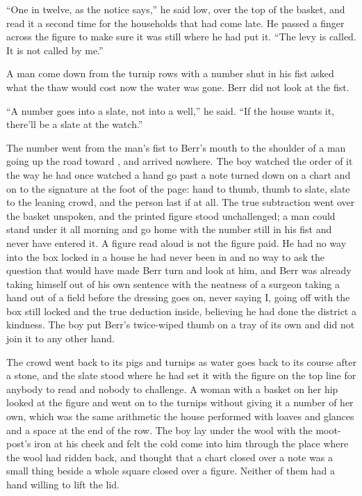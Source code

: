 “One in twelve, as the notice says,” he said low, over the top of the basket, and read it a second time for the households that had come late. He passed a finger across the figure to make sure it was still where he had put it. “The levy is called. It is not called by me.”

A man come down from the turnip rows with a number shut in his fist asked what the thaw would cost now the water was gone. Berr did not look at the fist.

“A number goes into a slate, not into a well,” he said. “If the house wants it, there'll be a slate at the watch.”

The number went from the man's fist to Berr's mouth to the shoulder of a man going up the road toward , and arrived nowhere. The boy watched the order of it the way he had once watched a hand go past a note turned down on a chart and on to the signature at the foot of the page: hand to thumb, thumb to slate, slate to the leaning crowd, and the person last if at all. The true subtraction went over the basket unspoken, and the printed figure stood unchallenged; a man could stand under it all morning and go home with the number still in his fist and never have entered it. A figure read aloud is not the figure paid. He had no way into the box locked in a house he had never been in and no way to ask the question that would have made Berr turn and look at him, and Berr was already taking himself out of his own sentence with the neatness of a surgeon taking a hand out of a field before the dressing goes on, never saying I, going off with the box still locked and the true deduction inside, believing he had done the district a kindness. The boy put Berr's twice-wiped thumb on a tray of its own and did not join it to any other hand.

The crowd went back to its pigs and turnips as water goes back to its course after a stone, and the slate stood where he had set it with the figure on the top line for anybody to read and nobody to challenge. A woman with a basket on her hip looked at the figure and went on to the turnips without giving it a number of her own, which was the same arithmetic the house performed with loaves and glances and a space at the end of the row. The boy lay under the wool with the moot-post's iron at his cheek and felt the cold come into him through the place where the wool had ridden back, and thought that a chart closed over a note was a small thing beside a whole square closed over a figure. Neither of them had a hand willing to lift the lid.

